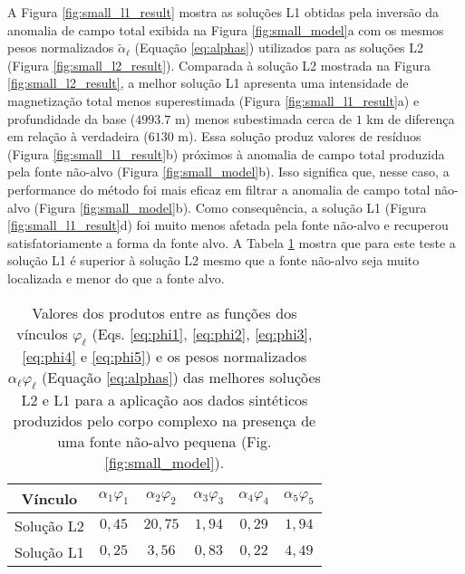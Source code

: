 A Figura \ref{fig:small_l1_result} mostra as soluções L1 obtidas pela inversão da anomalia de campo total exibida na Figura \ref{fig:small_model}a
com os mesmos pesos normalizados $\tilde{\alpha}_{\ell}$ (Equação \ref{eq:alphas})
utilizados para as soluções L2 (Figura \ref{fig:small_l2_result}).
Comparada à solução L2 mostrada na Figura \ref{fig:small_l2_result}, a melhor solução L1 apresenta uma intensidade de magnetização total menos superestimada (Figura 
\ref{fig:small_l1_result}a) e profundidade da base ($4993.7$ m) menos subestimada cerca de $ 1 $ km de diferença em relação à verdadeira ($6130$ m). Essa solução produz valores de resíduos (Figura \ref{fig:small_l1_result}b) 
próximos à anomalia de campo total produzida pela fonte não-alvo (Figura 
\ref{fig:small_model}b). 
Isso significa que, nesse caso, a performance do método foi mais eficaz em filtrar a anomalia de campo total não-alvo (Figura \ref{fig:small_model}b).
Como consequência, a solução L1 (Figura \ref{fig:small_l1_result}d) foi muito menos afetada pela fonte não-alvo e recuperou satisfatoriamente a forma da fonte alvo. 
A Tabela \ref{tab:small} mostra que para este teste a solução L1 é superior à solução L2 mesmo que a fonte não-alvo seja muito localizada e menor do que a fonte alvo.

\begin{table}[h]\label{tab:small}
	\caption{Valores dos produtos entre as funções dos vínculos $ \varphi_{\ell} $ (Eqs. \ref{eq:phi1}, \ref{eq:phi2}, \ref{eq:phi3}, \ref{eq:phi4} e \ref{eq:phi5}) e os pesos normalizados $ \alpha_\ell \varphi_\ell  $ (Equação \ref{eq:alphas}) das melhores soluções L2 e L1 para a aplicação aos dados sintéticos produzidos pelo corpo complexo na presença de uma fonte não-alvo pequena (Fig. \ref{fig:small_model}).}
	\centering
	\vspace{0.5cm}
	\begin{tabular}{c|ccccc}
		Vínculo & $ \alpha_{1}\varphi _1 $ & $ \alpha_{2}\varphi _2 $ &  $ \alpha_{3}\varphi _3 $ &  $ \alpha_{4}\varphi _4 $ &  $ \alpha_{5}\varphi _5 $ \\
		\hline
		Solução L2 & $ 0,45 $ & $ 20,75 $ & $ 1,94 $ & $ 0,29 $ & $ 1,94 $ \\ 
		Solução L1 & $ 0,25 $ & $ 3,56 $ & $ 0,83 $ & $ 0,22 $ & $ 4,49 $
	\end{tabular}
\end{table}

